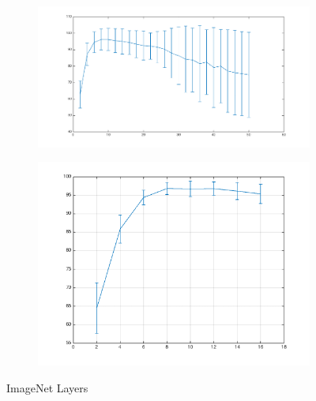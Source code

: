 \begin{figure}[h]
  \centering
  \begin{subfigure}[b]{0.40\textwidth}
   \includegraphics[width=\textwidth]{images/Layer3ImageNet.png}
    \caption{}
  \end{subfigure}
  \begin{subfigure}[b]{0.40\textwidth}
    \includegraphics[width=\textwidth]{images/Layer4ImageNet.png}
    \caption{}
  \end{subfigure}
  \caption{ImageNet Layers}
  \label{fig:user_artiststribution}
\end{figure}